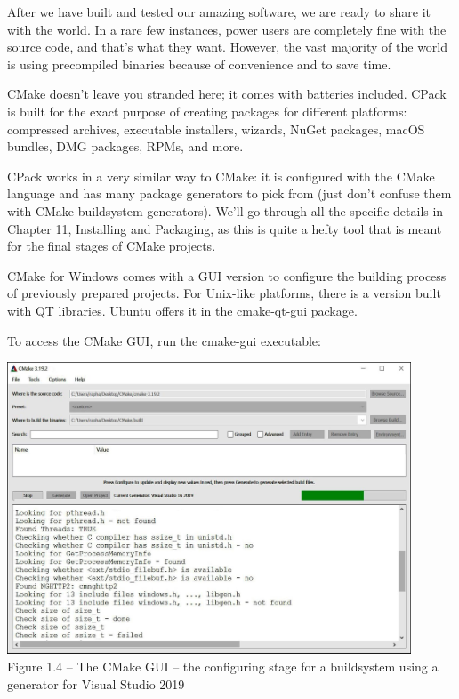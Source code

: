 

After we have built and tested our amazing software, we are ready to share it with the world. In a rare few instances, power users are completely fine with the source code, and that's what they want. However, the vast majority of the world is using precompiled binaries because of convenience and to save time.

CMake doesn't leave you stranded here; it comes with batteries included. CPack is built for the exact purpose of creating packages for different platforms: compressed archives, executable installers, wizards, NuGet packages, macOS bundles, DMG packages, RPMs, and more.

CPack works in a very similar way to CMake: it is configured with the CMake language and has many package generators to pick from (just don't confuse them with CMake buildsystem generators). We'll go through all the specific details in Chapter 11, Installing and Packaging, as this is quite a hefty tool that is meant for the final stages of CMake projects.


CMake for Windows comes with a GUI version to configure the building process of previously prepared projects. For Unix-like platforms, there is a version built with QT libraries. Ubuntu offers it in the cmake-qt-gui package.

To access the CMake GUI, run the cmake-gui executable:

\begin{center}
\includegraphics[width=0.9\textwidth]{content/1/chapter1/images/4.jpg}\\
Figure 1.4 – The CMake GUI – the configuring stage for a buildsystem using a generator for Visual Studio 2019
\end{center}

